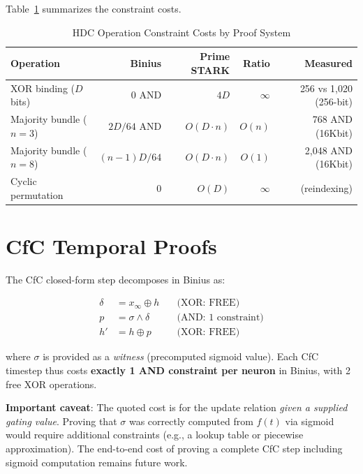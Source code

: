 \documentclass[11pt,twocolumn]{article}
\begin{document}
Table~\ref{tab:alignment} summarizes the constraint costs.

\begin{table}[t]
\centering
\caption{HDC Operation Constraint Costs by Proof System}
\label{tab:alignment}
\begin{tabular}{@{}lrrrr@{}}
\toprule
\textbf{Operation} & \textbf{Binius} & \textbf{Prime STARK} & \textbf{Ratio} & \textbf{Measured} \\
\midrule
XOR binding ($D$ bits) & 0 AND & $4D$ & $\infty$ & 256 vs 1,020 (256-bit) \\
Majority bundle ($n{=}3$) & $2D/64$ AND & $O(D \cdot n)$ & $O(n)$ & 768 AND (16Kbit) \\
Majority bundle ($n{=}8$) & $(n{-}1)D/64$ & $O(D \cdot n)$ & $O(1)$ & 2,048 AND (16Kbit) \\
Cyclic permutation & 0 & $O(D)$ & $\infty$ & (reindexing) \\
\bottomrule
\end{tabular}
\end{table}

\section{CfC Temporal Proofs}
\label{sec:cfc}

The CfC closed-form step decomposes in Binius as:

\begin{align}
\delta &= x_\infty \oplus h \quad &\text{(XOR: FREE)} \\
p &= \sigma \wedge \delta \quad &\text{(AND: 1 constraint)} \\
h' &= h \oplus p \quad &\text{(XOR: FREE)}
\end{align}

where $\sigma$ is provided as a \emph{witness} (precomputed sigmoid value). Each CfC timestep thus costs \textbf{exactly 1 AND constraint per neuron} in Binius, with 2 free XOR operations.

\textbf{Important caveat}: The quoted cost is for the update relation \emph{given a supplied gating value}. Proving that $\sigma$ was correctly computed from $f(t)$ via sigmoid would require additional constraints (e.g., a lookup table or piecewise approximation). The end-to-end cost of proving a complete CfC step including sigmoid computation remains future work.
\end{document}

